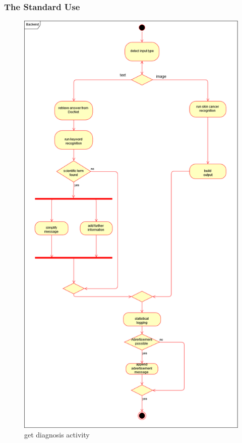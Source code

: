 \subsubsection{The Standard Use}
\begin{figure}[H]
\centering
    \includegraphics[scale=0.32]{SystemSpec/Usecases/Diagrams/GetDiagnosisActivity.png}
\caption{\label{fig:blue_rectangle}get diagnosis activity}
\end{figure}

